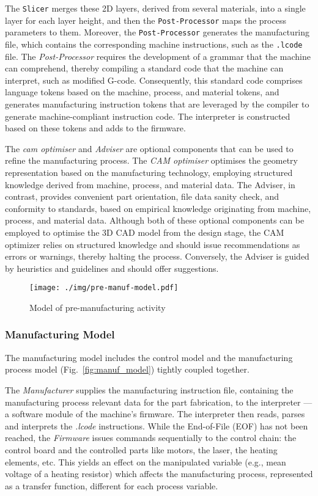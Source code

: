 The \texttt{Slicer} merges these 2D layers, derived from several materials, into
a single layer for each layer height, and then the \texttt{Post-Processor} maps
the process parameters to them. Moreover, the \texttt{Post-Processor} generates
the manufacturing file, which contains the corresponding machine instructions,
such as the \texttt{.lcode} file. The \emph{Post-Processor} requires the
development of a grammar that the machine can comprehend, thereby compiling a
standard code that the machine can interpret, such as modified
G-code. Consequently, this standard code comprises language tokens based on the
machine, process, and material tokens, and generates manufacturing instruction
tokens that are leveraged by the compiler to generate machine-compliant
instruction code. The interpreter is constructed based on these tokens and adds
to the firmware.


The \emph{\gls{cam} optimiser} and \emph{Adviser} are optional components that can be used to refine the manufacturing process. The \emph{CAM optimiser} optimises the geometry representation based on the manufacturing technology, employing structured knowledge derived from machine, process, and material data. The Adviser, in contrast, provides convenient part orientation, file data sanity check, and conformity to standards, based on empirical knowledge originating from machine, process, and material data. Although both of these optional components can be employed to optimise the 3D CAD model from the design stage, the CAM optimizer relies on structured knowledge and should issue recommendations as errors or warnings, thereby halting the process. Conversely, the Adviser is guided by heuristics and guidelines and should offer suggestions.

\begin{figure}[!hbt]
\centering
  \texttt{[image: ./img/pre-manuf-model.pdf]}
%
  \caption{Model of pre-manufacturing activity}%
\label{fig:pre-manuf_model}
\end{figure}

\subsubsection{Manufacturing Model}%
\label{sec:lbam-manuf-model}
The manufacturing model includes the control model and the manufacturing process
model (Fig.~\ref{fig:manuf_model}) tightly coupled together.

The \emph{Manufacturer} supplies the manufacturing
instruction file, containing the manufacturing process relevant data for the
part fabrication, to the interpreter --- a software module of the
machine's firmware.
The interpreter then reads, parses and interprets the
\emph{.lcode} instructions. While the End-of-File (EOF) has not been reached,
the \emph{Firmware} issues commands sequentially to the control chain: the control board and the
controlled parts like motors, the laser, the heating elements, etc.
This yields an effect on the manipulated variable (e.g., mean voltage of a
heating resistor) which affects the manufacturing
process, represented as a transfer function, different for each process
variable.

